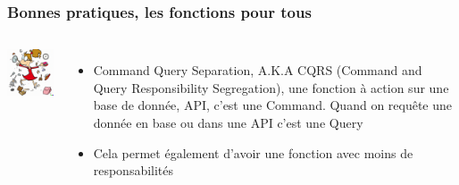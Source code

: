 \documentclass{beamer}
\begin{document}
    \begin{frame}
        \transdissolve
        \frametitle{Bonnes pratiques, les fonctions pour tous}
        \begin{columns}

            \centering
            \includegraphics[width=5cm]{image/doing-many-things.png}

            \begin{itemize}

                \item Command Query Separation, A.K.A CQRS (Command and Query Responsibility Segregation), une fonction à action sur une base de donnée, API, c'est une Command.
                Quand on requête une donnée en base ou dans une API c'est une Query
                \item Cela permet également d'avoir une fonction avec moins de responsabilités

            \end{itemize}

        \end{columns}
    \end{frame}
\end{document}
